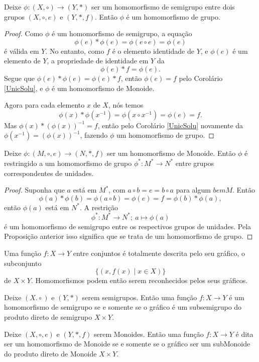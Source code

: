 \begin{stat}
  Deixe $\phi: (X,\circ) \to (Y,*)$ ser um homomorfismo de semigrupo entre dois grupos $(X,\circ,e)$ e $(Y,*,f)$. Então $\phi$ é um homomorfismo de grupo.
  \begin{proof}
    Como $\phi$ é um homomorfismo de semigrupo, a equação
    $$\phi(e)*\phi(e) = \phi(e\circ e)=\phi(e)$$
    é válida em $Y$. No entanto, como $f$ é o elemento identidade de $Y$, e $\phi(e)$ é um elemento de $Y$, a propriedade de identidade em $Y$ da $$\phi(e)*f=\phi(e).$$
    Segue que $\phi(e)*\phi(e)=\phi(e)*f$, então $\phi(e) =f$ pelo Corolário \ref{UnicSolu}, e $\phi$ é um homomorfismo de Monoide.

    Agora para cada elemento $x$ de $X$, nós temos $$\phi(x)*\phi(x^{-1})=\phi(x\circ x^{-1}) = \phi(e)=f.$$
    Mas $\phi(x)*(\phi(x))^{-1} = f$, então pelo Corolário \ref{UnicSolu} novamente da $\phi(x^{-1})=(\phi(x))^{-1}$, fazendo $\phi$ um homomorfismo de grupo.
  \end{proof}
\end{stat}

\begin{theorem}
  Deixe $\phi:(M,\circ,e)\to (N,*,f)$ ser um homomorfismo de Monoide. Então $\phi$ é restringido a um homomorfismo de grupo $\phi^{*}:M^* \to N^*$ entre grupos correspondentes de unidades.
  \begin{proof}
    Suponha que $a$ está em $M^*$, com $a\circ b = e = b\circ a$ para algum $b em M$. Então
    $$\phi(a)* \phi (b) = \phi(a \circ b) = \phi(e) = f = \phi(b) * \phi(a),$$
    então $\phi(a)$ está em $N^*$. A restrição $$\phi^{*}:M^{*}\to N^{*};\ a\mapsto \phi(a)$$
    é um homomorfismo de semigrupo entre os respectivos grupos de unidades. Pela Proposição anterior isso significa que se trata de um homomorfismo de grupo.
  \end{proof}
\end{theorem}
Uma função $f:X\to Y$ entre conjuntos é totalmente descrita pelo seu gráfico, o subconjunto
$$\{(x,f(x)\mid x \in X)\}$$ de $X\times Y$. Homomorfismos podem então serem reconhecidos pelos seus gráficos.

\begin{stat}
  Deixe $(X.\circ)$ e $(Y,*)$ serem semigrupos. Então uma função $f: X\to Y$ é um homomorfismo de semigrupo se e somente se o gráfico é um subsemigrupo do produto direto de semigrupo $X\times Y$.
\end{stat}
\begin{corollary}
  Deixe $(X,\circ, e)$ e $(Y,*,f)$ serem Monoides. Então uma função $f: X \to Y$ é dita ser um homomorfismo de Monoide se e somente se o gráfico ser um subMonoide do produto direto de Monoide $X\times Y$.
\end{corollary}

